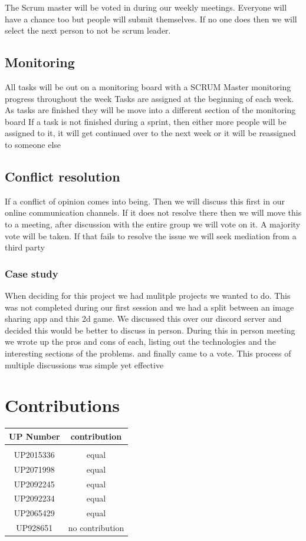 \documentclass{article}
\begin{document}
The Scrum master will be voted in during our weekly meetings. Everyone will have
a chance too but people will submit themselves. If no one does then we will
select the next person to not be scrum leader.

\subsection{Monitoring}%
\label{subsec:mon}
All tasks will be out on a monitoring board with a SCRUM Master monitoring progress throughout the week
Tasks are assigned at the beginning of each week.
As tasks are finished they will be move into a different section of the monitoring board
If a task is not finished during a sprint, then either more people will be assigned to it, it will get continued over to the next week or it will be reassigned to someone else

\subsection{Conflict resolution}%
\label{subsec:cres}

If a conflict of opinion comes into being. Then we will discuss this first in
our online communication channels.
If it does not resolve there then we will move this to a meeting, after
discussion with the entire group we will vote on it. A majority vote will be
taken.
If that fails to resolve the issue we will seek mediation from a third party

\subsubsection{Case study}
When deciding for this project we had mulitple projects we wanted to do.
This was not completed during our first session and we had a split between an
image sharing app and this 2d game.
We discussed this over our discord server and decided this would be better to
discuss in person.
During this in person meeting we wrote up the pros and cons of each, listing out
the technologies and the interesting sections of the problems. and finally came
to a vote. This process of multiple discussions was simple yet effective

\section{Contributions}%
\label{sec:contrib}
\begin{tabular}{c | c}
	UP Number & contribution    \\
	\hline                      \\
	UP2015336 & equal           \\
	UP2071998 & equal           \\
	UP2092245 & equal           \\
	UP2092234 & equal           \\
	UP2065429 & equal           \\
	UP928651  & no contribution
\end{tabular}
\end{document}
